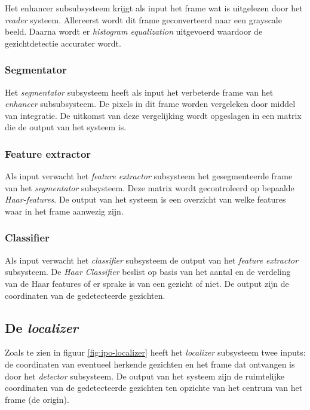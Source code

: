 Het enhancer subsubsysteem krijgt als input het frame wat is uitgelezen door
het \emph{reader} systeem. Allereerst wordt dit frame geconverteerd naar een
grayscale beeld. Daarna wordt er \emph{histogram equalization} uitgevoerd
waardoor de gezichtdetectie accurater wordt.

\subsubsection{Segmentator}

Het \emph{segmentator} subsysteem heeft als input
het verbeterde frame van het \emph{enhancer} subsubsysteem. De pixels in dit
frame worden vergeleken door middel van integratie. De uitkomst van deze
vergelijking wordt opgeslagen in een matrix die de output van het systeem is.

\subsubsection{Feature extractor}

Als input verwacht het \emph{feature extractor} subsysteem het gesegmenteerde
frame van het \emph{segmentator} subsysteem. Deze matrix wordt gecontroleerd
op bepaalde \emph{Haar-features}. De output van het systeem is een overzicht
van welke features waar in het frame aanwezig zijn.

\subsubsection{Classifier}

Als input verwacht het \emph{classifier} subsysteem de output van het \emph{feature
extractor} subsysteem. De \emph{Haar Classifier} beslist op basis van het aantal
en de verdeling van de Haar features of er sprake is van een gezicht of niet.
De output zijn de coordinaten van de gedetecteerde gezichten.

\subsection{De \emph{localizer}}

Zoals te zien in figuur \ref{fig:ipo-localizer} heeft het \emph{localizer}
subsysteem twee inputs: de coordinaten van eventueel herkende gezichten en
het frame dat ontvangen is door het \emph{detector} subsysteem. De output
van het systeem zijn de ruimtelijke coordinaten van de gedetecteerde gezichten
ten opzichte van het centrum van het frame (de origin).

